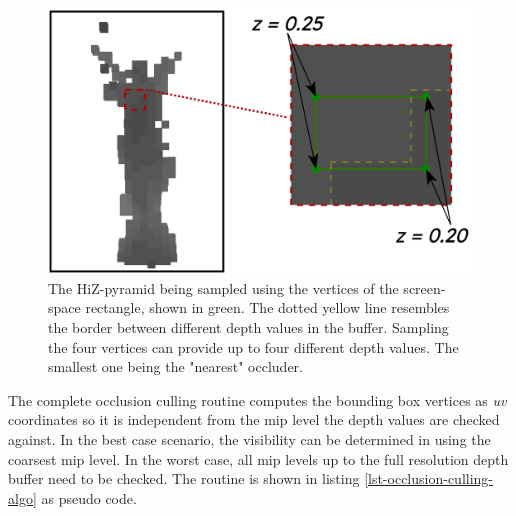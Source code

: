 \begin{figure}[h]
    \centering
    \includegraphics[width=\linewidth]{images/graphics/visibility-hiz-sampling.jpg}
    \caption{The \ac{HiZ}-pyramid being sampled using the vertices of the screen-space rectangle, shown in green. 
    The dotted yellow line resembles the border between different depth values in the buffer. Sampling the four 
    vertices can provide up to four different depth values. The smallest one being the "nearest" occluder.}
    \label{fig:visibility-hiz-sampling}
\end{figure}


\noindent
The complete occlusion culling routine computes the bounding box vertices as \emph{uv} coordinates so it is independent 
from the mip level the depth values are checked against. In the best case scenario, the visibility can be determined in 
using the coarsest mip level. In the worst case, all mip levels up to the full resolution depth buffer need to be checked.
The routine is shown in listing \ref{lst-occlusion-culling-algo} as pseudo code.

